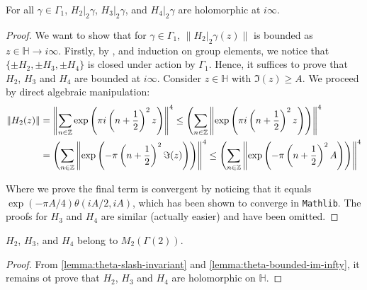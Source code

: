 \begin{lemma}\label{lemma:theta-bounded-im-infty}\leanok
  For all $\gamma \in \Gamma_1$, $H_{2}|_2 \gamma$, $H_{3}|_2 \gamma$, and $H_{4}|_2 \gamma$ are holomorphic at $i\infty$.
\end{lemma}
\begin{proof}
    \leanok
    We want to show that for $\gamma \in \Gamma_1$, $\|H_2|_2\gamma(z)\|$ is bounded as $z \in \mathbb{H} \to i\infty$. Firstly, by ,  and induction on group elements, we notice that $\{\pm H_2, \pm H_3, \pm H_4\}$ is closed under action by $\Gamma_1$. Hence, it suffices to prove that $H_2$, $H_3$ and $H_4$ are bounded at $i\infty$. Consider $z \in \mathbb{H}$ with $\Im(z) \geq A$. We proceed by direct algebraic manipulation:
    \begin{align}
        \|H_2(z)\|
        &= \left\|\sum_{n \in \mathbb{Z}} \exp\left(\pi i \left(n + \frac{1}{2}\right)^2 z\right)\right\|^4
        \leq \left(\sum_{n \in \mathbb{Z}} \left\|\exp\left(\pi i \left(n + \frac{1}{2}\right)^2 z\right)\right)\right\|^4 \\
        &= \left(\sum_{n \in \mathbb{Z}} \left\|\exp\left(-\pi \left(n + \frac{1}{2}\right)^2 \Im(z)\right)\right)\right\|^4
        \leq \left(\sum_{n \in \mathbb{Z}} \left\|\exp\left(-\pi \left(n + \frac{1}{2}\right)^2 A\right)\right)\right\|^4
    \end{align}

    Where we prove the final term is convergent by noticing that it equals $\exp(-\pi A / 4)\theta(iA / 2, iA)$, which has been shown to converge in \texttt{Mathlib}. The proofs for $H_3$ and $H_4$ are similar (actually easier) and have been omitted.

\end{proof}

\begin{lemma}\label{lemma:theta-modular}\leanok
$H_{2}$, $H_{3}$, and $H_{4}$ belong to $M_2(\Gamma(2))$.
\end{lemma}
\begin{proof}
    \leanok
    From \cref{lemma:theta-slash-invariant} and \cref{lemma:theta-bounded-im-infty}, it remains ot prove that $H_2$, $H_3$ and $H_4$ are holomorphic on $\mathbb{H}$. 
\end{proof}


